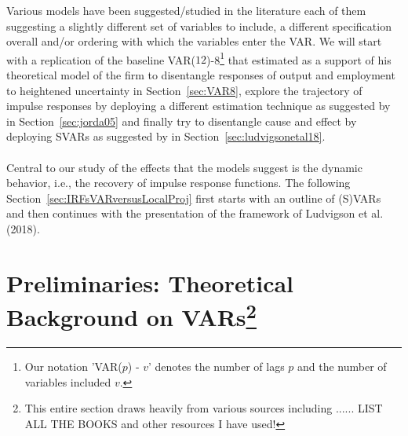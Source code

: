 \documentclass[a4paper,11pt,listof=nochaptergap,oneside,pointednumbers,bibtotoc,bigheadings,liststotoc]{scrbook}
\theoremstyle{mysatz}
\theoremstyle{mydefinition}
\theoremstyle{mybemerkung}
\begin{document}
\endgroup

Various models have been suggested/studied in the literature each of them suggesting a slightly different set of variables to include, a different specification overall and/or ordering with which the variables enter the VAR. We will start with a replication of the baseline VAR($12$)-8\footnote{Our notation 'VAR($p$) - $v$' denotes the number of lags $p$ and the number of variables included $v$.} that \citet{bloom:09} estimated as a support of his theoretical model of the firm to disentangle responses of output and employment to heightened uncertainty in Section~\ref{sec:VAR8}, explore the trajectory of impulse responses by deploying a different estimation technique as suggested by \citet{jorda:05} in Section~\ref{sec:jorda05} and finally try to disentangle cause and effect by deploying SVARs as suggested by \citet{ludvigsonetal:18} in Section~\ref{sec:ludvigsonetal18}.\\
\\


Central to our study of the effects that the models suggest is the dynamic behavior, i.e., the recovery of impulse response functions. The following Section~\ref{sec:IRFsVARversusLocalProj} first starts with an outline of (S)VARs and then continues with the presentation of the framework of Ludvigson et al. (2018).

\section[Preliminaries: Theoretical Background on (S)VARs]{Preliminaries: Theoretical Background on VARs\footnote{This entire section draws heavily from various sources including ...... LIST ALL THE BOOKS and other resources I have used!}}
\label{sec:TheoreticalBackgroundSVARs}
\end{document}
